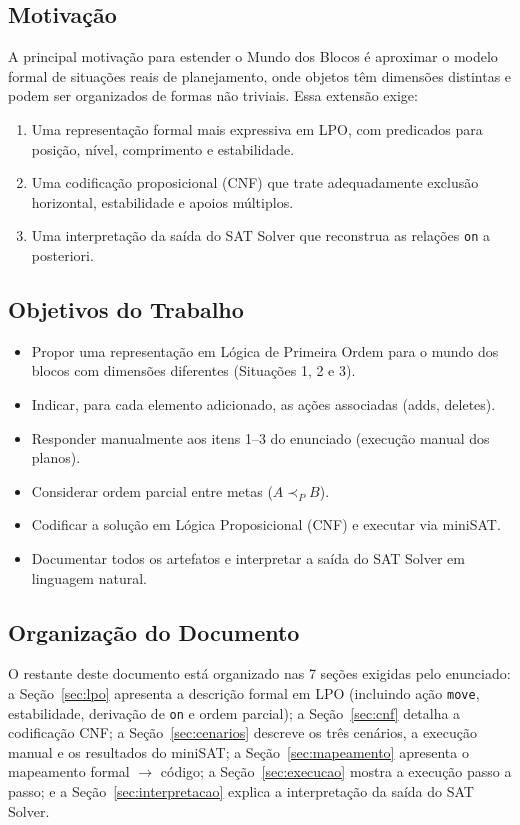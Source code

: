 \documentclass[12pt,a4paper]{article}
\begin{document}
\subsection{Motivação}

A principal motivação para estender o Mundo dos Blocos é aproximar o modelo formal de situações reais de planejamento, onde objetos têm dimensões distintas e podem ser organizados de formas não triviais. Essa extensão exige:

\begin{enumerate}[leftmargin=1.2cm]
    \item Uma representação formal mais expressiva em LPO, com predicados para posição, nível, comprimento e estabilidade.
    \item Uma codificação proposicional (CNF) que trate adequadamente exclusão horizontal, estabilidade e apoios múltiplos.
    \item Uma interpretação da saída do SAT Solver que reconstrua as relações \texttt{on} a posteriori.
\end{enumerate}

\subsection{Objetivos do Trabalho}

\begin{itemize}[leftmargin=1.2cm]
    \item Propor uma representação em Lógica de Primeira Ordem para o mundo dos blocos com dimensões diferentes (Situações 1, 2 e 3).
    \item Indicar, para cada elemento adicionado, as ações associadas (adds, deletes).
    \item Responder manualmente aos itens 1--3 do enunciado (execução manual dos planos).
    \item Considerar ordem parcial entre metas ($A \prec_P B$).
    \item Codificar a solução em Lógica Proposicional (CNF) e executar via miniSAT.
    \item Documentar todos os artefatos e interpretar a saída do SAT Solver em linguagem natural.
\end{itemize}

\subsection{Organização do Documento}

O restante deste documento está organizado nas 7 seções exigidas pelo enunciado: a Seção~\ref{sec:lpo} apresenta a descrição formal em LPO (incluindo ação \texttt{move}, estabilidade, derivação de \texttt{on} e ordem parcial); a Seção~\ref{sec:cnf} detalha a codificação CNF; a Seção~\ref{sec:cenarios} descreve os três cenários, a execução manual e os resultados do miniSAT; a Seção~\ref{sec:mapeamento} apresenta o mapeamento formal $\to$ código; a Seção~\ref{sec:execucao} mostra a execução passo a passo; e a Seção~\ref{sec:interpretacao} explica a interpretação da saída do SAT Solver.
\end{document}
